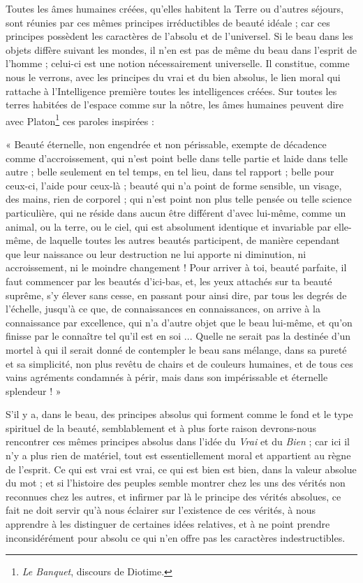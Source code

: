 \documentclass[a4paper, 11pt, oneside, landscape]{article}
\begin{document}
Toutes les âmes humaines créées, qu'elles habitent la Terre ou d'autres séjours, sont réunies par ces mêmes principes irréductibles de beauté idéale ; car ces principes possèdent les caractères de l'absolu et de l'universel. Si le beau dans les objets diffère suivant les mondes, il n'en est pas de même du beau dans l'esprit de l'homme ; celui-ci est une notion nécessairement universelle. Il constitue, comme nous le verrons, avec les principes du vrai et du bien absolus, le lien moral qui rattache à l'Intelligence première toutes les intelligences créées. Sur toutes les terres habitées de l'espace comme sur la nôtre, les âmes humaines peuvent dire avec Platon\footnote{\emph{Le Banquet}, discours de Diotime.} ces paroles inspirées :

« Beauté éternelle, non engendrée et non périssable, exempte de décadence comme d'accroissement, qui n'est point belle dans telle partie et laide dans telle autre ; belle seulement en tel temps, en tel lieu, dans tel rapport ; belle pour ceux-ci, l'aide pour ceux-là ; beauté qui n'a point de forme sensible, un visage, des mains, rien de corporel ; qui n'est point non plus telle pensée ou telle science particulière, qui ne réside dans aucun être différent d'avec lui-même, comme un animal, ou la terre, ou le ciel, qui est absolument identique et invariable par elle-même, de laquelle toutes les autres beautés participent, de manière cependant que leur naissance ou leur destruction ne lui apporte ni diminution, ni accroissement, ni le moindre changement ! Pour arriver à toi, beauté parfaite, il faut commencer par les beautés d'ici-bas, et, les yeux attachés sur ta beauté suprême, s'y élever sans cesse, en passant pour ainsi dire, par tous les degrés de l'échelle, jusqu'à ce que, de connaissances en connaissances, on arrive à la connaissance par excellence, qui n'a d'autre objet que le beau lui-même, et qu'on finisse par le connaître tel qu'il est en soi ... Quelle ne serait pas la destinée d'un mortel à qui il serait donné de contempler le beau sans mélange, dans sa pureté et sa simplicité, non plus revêtu de chairs et de couleurs humaines, et de tous ces vains agréments condamnés à périr, mais dans son impérissable et éternelle splendeur ! »

S'il y a, dans le beau, des principes absolus qui forment comme le fond et le type spirituel de la beauté, semblablement et à plus forte raison devrons-nous rencontrer ces mêmes principes absolus dans l'idée du \emph{Vrai} et du \emph{Bien} ; car ici il n'y a plus rien de matériel, tout est essentiellement moral et appartient au règne de l'esprit. Ce qui est vrai est vrai, ce qui est bien est bien, dans la valeur absolue du mot ; et si l'histoire des peuples semble montrer chez les uns des vérités non reconnues chez les autres, et infirmer par là le principe des vérités absolues, ce fait ne doit servir qu'à nous éclairer sur l'existence de ces vérités, à nous apprendre à les distinguer de certaines idées relatives, et à ne point prendre inconsidérément pour absolu ce qui n'en offre pas les caractères indestructibles.
\end{document}
